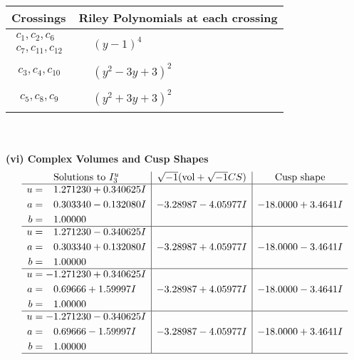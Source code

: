\documentclass[1p]{elsarticle_modified}
\theoremstyle{definition}
\newcommand{\I}{\sqrt{-1}}
\begin{document}
\begin{tabular}{m{50pt}|m{274pt}}
Crossings & \hspace{64pt}Riley Polynomials at each crossing \\
\hline $$\begin{aligned}c_{1},c_{2},c_{6}\\c_{7},c_{11},c_{12}\end{aligned}$$&$\begin{aligned}
&(y-1)^4
\end{aligned}$\\
\hline $$\begin{aligned}c_{3},c_{4},c_{10}\end{aligned}$$&$\begin{aligned}
&(y^2-3 y+3)^2
\end{aligned}$\\
\hline $$\begin{aligned}c_{5},c_{8},c_{9}\end{aligned}$$&$\begin{aligned}
&(y^2+3 y+3)^2
\end{aligned}$\\
\hline
\end{tabular}\\~\\
\newpage\flushleft \textbf{(vi) Complex Volumes and Cusp Shapes}
$$\begin{array}{c|c|c}  
\text{Solutions to }I^u_{3}& \I (\text{vol} + \sqrt{-1}CS) & \text{Cusp shape}\\
 \hline 
\begin{aligned}
u &= \phantom{-}1.271230 + 0.340625 I \\
a &= \phantom{-}0.303340 - 0.132080 I \\
b &= \phantom{-}1.00000\phantom{ +0.000000I}\end{aligned}
 & -3.28987 - 4.05977 I & -18.0000 + 3.4641 I \\ \hline\begin{aligned}
u &= \phantom{-}1.271230 - 0.340625 I \\
a &= \phantom{-}0.303340 + 0.132080 I \\
b &= \phantom{-}1.00000\phantom{ +0.000000I}\end{aligned}
 & -3.28987 + 4.05977 I & -18.0000 - 3.4641 I \\ \hline\begin{aligned}
u &= -1.271230 + 0.340625 I \\
a &= \phantom{-}0.69666 + 1.59997 I \\
b &= \phantom{-}1.00000\phantom{ +0.000000I}\end{aligned}
 & -3.28987 + 4.05977 I & -18.0000 - 3.4641 I \\ \hline\begin{aligned}
u &= -1.271230 - 0.340625 I \\
a &= \phantom{-}0.69666 - 1.59997 I \\
b &= \phantom{-}1.00000\phantom{ +0.000000I}\end{aligned}
 & -3.28987 - 4.05977 I & -18.0000 + 3.4641 I\\
 \hline 
 \end{array}$$\newpage\newpage\renewcommand{\arraystretch}{1}
\end{document}

